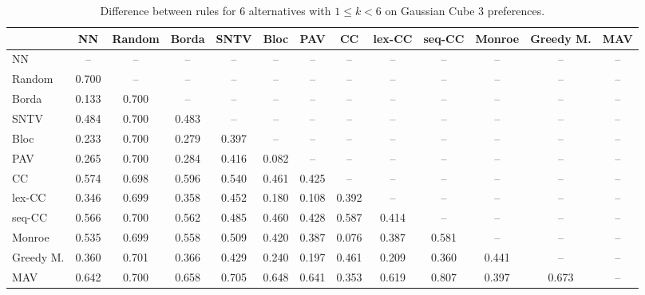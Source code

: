 
\begin{table*}[h!]
\centering
\begin{tabular}{lcccccccccccc}
\toprule
 & NN & Random & Borda & SNTV & Bloc & PAV & CC & lex-CC & seq-CC & Monroe & Greedy M. & MAV \\
\midrule
NN & -- & -- & -- & -- & -- & -- & -- & -- & -- & -- & -- & -- \\
Random & 0.700 & -- & -- & -- & -- & -- & -- & -- & -- & -- & -- & -- \\
Borda & 0.133 & 0.700 & -- & -- & -- & -- & -- & -- & -- & -- & -- & -- \\
SNTV & 0.484 & 0.700 & 0.483 & -- & -- & -- & -- & -- & -- & -- & -- & -- \\
Bloc & 0.233 & 0.700 & 0.279 & 0.397 & -- & -- & -- & -- & -- & -- & -- & -- \\
PAV & 0.265 & 0.700 & 0.284 & 0.416 & 0.082 & -- & -- & -- & -- & -- & -- & -- \\
CC & 0.574 & 0.698 & 0.596 & 0.540 & 0.461 & 0.425 & -- & -- & -- & -- & -- & -- \\
lex-CC & 0.346 & 0.699 & 0.358 & 0.452 & 0.180 & 0.108 & 0.392 & -- & -- & -- & -- & -- \\
seq-CC & 0.566 & 0.700 & 0.562 & 0.485 & 0.460 & 0.428 & 0.587 & 0.414 & -- & -- & -- & -- \\
Monroe & 0.535 & 0.699 & 0.558 & 0.509 & 0.420 & 0.387 & 0.076 & 0.387 & 0.581 & -- & -- & -- \\
Greedy M. & 0.360 & 0.701 & 0.366 & 0.429 & 0.240 & 0.197 & 0.461 & 0.209 & 0.360 & 0.441 & -- & -- \\
MAV & 0.642 & 0.700 & 0.658 & 0.705 & 0.648 & 0.641 & 0.353 & 0.619 & 0.807 & 0.397 & 0.673 & -- \\
\bottomrule
\end{tabular}

\caption{Difference between rules for 6 alternatives with $1 \leq k < 6$ on Gaussian Cube 3 preferences.}
\end{table*}

